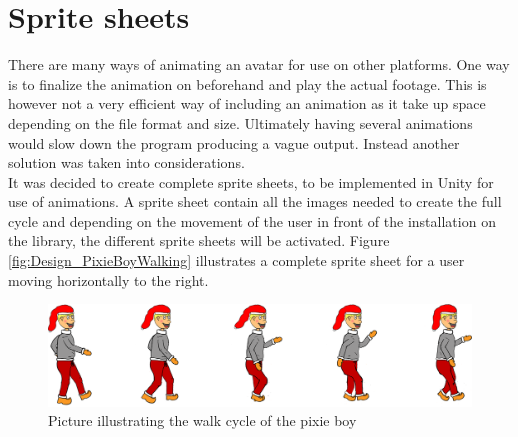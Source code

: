 \section{Sprite sheets}
There are many ways of animating an avatar for use on other platforms. One way is to finalize the animation on beforehand and play the actual footage. This is however not a very efficient way of including an animation as it take up space depending on the file format and size. Ultimately having several animations would slow down the program producing a vague output. Instead another solution was taken into considerations.\\
It was decided to create complete sprite sheets, to be implemented in Unity for use of animations. A sprite sheet contain all the images needed to create the full cycle and depending on the movement of the user in front of the installation on the library, the different sprite sheets will be activated. Figure \eqref{fig:Design_PixieBoyWalking} illustrates a complete sprite sheet for a user moving horizontally to the right.
\begin{figure}[htbp]
\centering
\includegraphics[width=1.00\textwidth]{Pictures/Design/PixieWalking.png}
\caption{Picture illustrating the walk cycle of the pixie boy}
\label{fig:Design_PixieBoyWalking}
\end{figure}